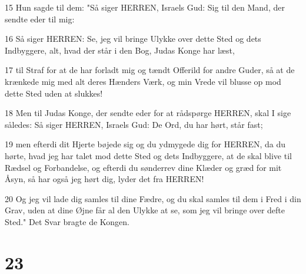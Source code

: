 \par 15 Hun sagde til dem: "Så siger HERREN, Israels Gud: Sig til den Mand, der sendte eder til mig:
\par 16 Så siger HERREN: Se, jeg vil bringe Ulykke over dette Sted og dets Indbyggere, alt, hvad der står i den Bog, Judas Konge har læst,
\par 17 til Straf for at de har forladt mig og tændt Offerild for andre Guder, så at de krænkede mig med alt deres Hænders Værk, og min Vrede vil blusse op mod dette Sted uden at slukkes!
\par 18 Men til Judas Konge, der sendte eder for at rådspørge HERREN, skal I sige således: Så siger HERREN, Israels Gud: De Ord, du har hørt, står fast;
\par 19 men efterdi dit Hjerte bøjede sig og du ydmygede dig for HERREN, da du hørte, hvad jeg har talet mod dette Sted og dets Indbyggere, at de skal blive til Rædsel og Forbandelse, og efterdi du sønderrev dine Klæder og græd for mit Åsyn, så har også jeg hørt dig, lyder det fra HERREN!
\par 20 Og jeg vil lade dig samles til dine Fædre, og du skal samles til dem i Fred i din Grav, uden at dine Øjne får al den Ulykke at se, som jeg vil bringe over defte Sted." Det Svar bragte de Kongen.

\chapter{23}

